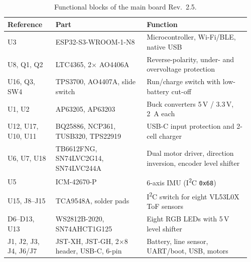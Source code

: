 \begin{otherlanguage}{english}
\begin{table}[htbp]
  \centering\small
  \caption{Functional blocks of the main board Rev.~2.5.}
  \label{tab:hw_blocks}
  \begin{tabular}{@{}p{0.19\linewidth}p{0.36\linewidth}p{0.41\linewidth}@{}}
    \toprule
    \textbf{Reference} & \textbf{Part} & \textbf{Function} \\
    \midrule
    U3 & ESP32-S3-WROOM-1-N8 & Microcontroller, Wi-Fi/BLE, native USB \cite{EspressifS3Module} \\
    U8, Q1, Q2 & LTC4365, 2$\times$ AO4406A & Reverse-polarity, under- and overvoltage protection \\
    U16, Q3, SW4 & TPS3700, AO4407A, slide switch & Run/charge switch with low-battery cut-off \\
    U1, U2 & AP63205, AP63203 & Buck converters 5\,V / 3.3\,V, \SI{2}{\ampere} each \\
    U12, U17, U10, U11 & BQ25886, NCP361, TUSB320, TPS22919 & USB-C input protection and 2-cell charger \\
    U6, U7, U18 & TB6612FNG, SN74LVC2G14, SN74LVC244A & Dual motor driver, direction inversion, encoder level shifter \\
    U5 & ICM-42670-P & 6-axis IMU (I\textsuperscript{2}C \texttt{0x68}) \\
    U15, J8--J15 & TCA9548A, solder pads & I\textsuperscript{2}C switch for eight VL53L0X ToF sensors \\
    D6--D13, U13 & WS2812B-2020, SN74AHCT1G125 & Eight RGB LEDs with 5\,V level shifter \\
    J1, J2, J3, J4, J6/J7 & JST-XH, JST-GH, 2$\times$8 header, USB-C, 6-pin & Battery, line sensor, UART/boot, USB, motors \\
    \bottomrule
  \end{tabular}
\end{table}


\end{otherlanguage}
